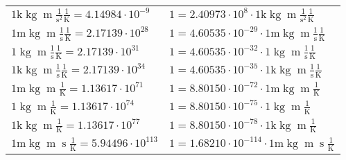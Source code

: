 \begin{center}
\begin{longtable}{l l}
{\color{gray}$1 \bm{\mathrm{ k}}\operatorname{kg}{\operatorname{m}}\frac1{\operatorname{s}^2}{}\frac1{\operatorname{K}} = 4.14984\cdot10^{-9} $}   & {\color{gray}$ 1 = 2.40973\cdot10^{8} \cdot 1 \bm{\mathrm{ k}}\operatorname{kg}{\operatorname{m}}\frac1{\operatorname{s}^2}{}\frac1{\operatorname{K}}$}  \\
{\color{gray}$1 \bm{\mathrm{ m}}\operatorname{kg}{\operatorname{m}}\frac1{\operatorname{s}}{}\frac1{\operatorname{K}} = 2.17139\cdot10^{28} $}   & {\color{gray}$ 1 = 4.60535\cdot10^{-29} \cdot 1 \bm{\mathrm{ m}}\operatorname{kg}{\operatorname{m}}\frac1{\operatorname{s}}{}\frac1{\operatorname{K}}$}  \\
{\color{black}$1 \bm{\mathrm{ }}\operatorname{kg}{\operatorname{m}}\frac1{\operatorname{s}}{}\frac1{\operatorname{K}} = 2.17139\cdot10^{31} $}   & {\color{black}$ 1 = 4.60535\cdot10^{-32} \cdot 1 \bm{\mathrm{ }}\operatorname{kg}{\operatorname{m}}\frac1{\operatorname{s}}{}\frac1{\operatorname{K}}$}  \\
{\color{gray}$1 \bm{\mathrm{ k}}\operatorname{kg}{\operatorname{m}}\frac1{\operatorname{s}}{}\frac1{\operatorname{K}} = 2.17139\cdot10^{34} $}   & {\color{gray}$ 1 = 4.60535\cdot10^{-35} \cdot 1 \bm{\mathrm{ k}}\operatorname{kg}{\operatorname{m}}\frac1{\operatorname{s}}{}\frac1{\operatorname{K}}$}  \\
{\color{gray}$1 \bm{\mathrm{ m}}\operatorname{kg}{\operatorname{m}}{}{}\frac1{\operatorname{K}} = 1.13617\cdot10^{71} $}   & {\color{gray}$ 1 = 8.80150\cdot10^{-72} \cdot 1 \bm{\mathrm{ m}}\operatorname{kg}{\operatorname{m}}{}{}\frac1{\operatorname{K}}$}  \\
{\color{black}$1 \bm{\mathrm{ }}\operatorname{kg}{\operatorname{m}}{}{}\frac1{\operatorname{K}} = 1.13617\cdot10^{74} $}   & {\color{black}$ 1 = 8.80150\cdot10^{-75} \cdot 1 \bm{\mathrm{ }}\operatorname{kg}{\operatorname{m}}{}{}\frac1{\operatorname{K}}$}  \\
{\color{gray}$1 \bm{\mathrm{ k}}\operatorname{kg}{\operatorname{m}}{}{}\frac1{\operatorname{K}} = 1.13617\cdot10^{77} $}   & {\color{gray}$ 1 = 8.80150\cdot10^{-78} \cdot 1 \bm{\mathrm{ k}}\operatorname{kg}{\operatorname{m}}{}{}\frac1{\operatorname{K}}$}  \\
{\color{gray}$1 \bm{\mathrm{ m}}\operatorname{kg}{\operatorname{m}}{\operatorname{s}}{}\frac1{\operatorname{K}} = 5.94496\cdot10^{113} $}   & {\color{gray}$ 1 = 1.68210\cdot10^{-114} \cdot 1 \bm{\mathrm{ m}}\operatorname{kg}{\operatorname{m}}{\operatorname{s}}{}\frac1{\operatorname{K}}$}  \\

\end{longtable}
\end{center}
